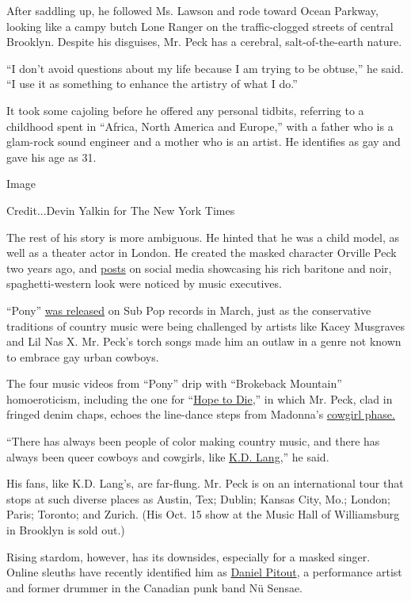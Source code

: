 After saddling up, he followed Ms. Lawson and rode toward Ocean Parkway,
looking like a campy butch Lone Ranger on the traffic-clogged streets of
central Brooklyn. Despite his disguises, Mr. Peck has a cerebral,
salt-of-the-earth nature.

``I don't avoid questions about my life because I am trying to be
obtuse,'' he said. ``I use it as something to enhance the artistry of
what I do.''

It took some cajoling before he offered any personal tidbits, referring
to a childhood spent in ``Africa, North America and Europe,'' with a
father who is a glam-rock sound engineer and a mother who is an artist.
He identifies as gay and gave his age as 31.

Image

Credit...Devin Yalkin for The New York Times

The rest of his story is more ambiguous. He hinted that he was a child
model, as well as a theater actor in London. He created the masked
character Orville Peck two years ago, and
\href{https://www.instagram.com/p/BbSeU8QD57B/}{posts} on social media
showcasing his rich baritone and noir, spaghetti-western look were
noticed by music executives.

``Pony'' \href{https://orvillepeck.bandcamp.com/album/pony}{was
released} on Sub Pop records in March, just as the conservative
traditions of country music were being challenged by artists like Kacey
Musgraves and Lil Nas X. Mr. Peck's torch songs made him an outlaw in a
genre not known to embrace gay urban cowboys.

The four music videos from ``Pony'' drip with ``Brokeback Mountain''
homoeroticism, including the one for
``\href{https://www.youtube.com/watch?v=60MHmrtEuRY}{Hope to Die},'' in
which Mr. Peck, clad in fringed denim chaps, echoes the line-dance steps
from Madonna's
\href{https://www.youtube.com/watch?v=gLFWRDsx5AI}{cowgirl phase.}

``There has always been people of color making country music, and there
has always been queer cowboys and cowgirls, like
\href{https://www.nytimes.com/2018/03/22/style/kd-lang-ingenue-tour.html}{K.D.
Lang},'' he said.

His fans, like K.D. Lang's, are far-flung. Mr. Peck is on an
international tour that stops at such diverse places as Austin, Tex;
Dublin; Kansas City, Mo.; London; Paris; Toronto; and Zurich. (His Oct.
15 show at the Music Hall of Williamsburg in Brooklyn is sold out.)

Rising stardom, however, has its downsides, especially for a masked
singer. Online sleuths have recently identified him as
\href{http://www.brooklynvegan.com/orville-peck-is-daniel-pitout-of-nu-sensae-eating-out-lp-tour-coming-soon/}{Daniel
Pitout}, a performance artist and former drummer in the Canadian punk
band Nü Sensae.

